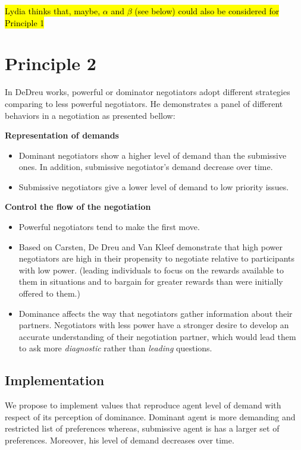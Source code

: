 \documentclass{article}
\begin{document}
\hl{Lydia thinks that, maybe, $\alpha$ and $\beta$ (see below) could also be considered for Principle 1}


\section{Principle 2}

In DeDreu works, powerful or dominator negotiators adopt different strategies comparing to less powerful negotiators. He demonstrates a panel of different behaviors in a negotiation as presented bellow:


\textbf{Representation of demands}
\begin{itemize}
	\item Dominant negotiators show a higher level of demand than the submissive ones. In addition, submissive negotiator's demand decrease over time. 
	\item Submissive negotiators give a lower level of demand to low priority issues.
\end{itemize} 



\textbf{Control the flow of the negotiation}
\begin{itemize}
	\item Powerful negotiators tend to make the first move. \cite{magee2007power}

	\item Based on Carsten, De Dreu and Van Kleef demonstrate that high power negotiators are high in their propensity to negotiate relative to participants with low power. (leading individuals to focus on the rewards available to them in situations and to bargain for	greater rewards than were initially offered to them.)

	\item Dominance affects the way that negotiators gather information about their partners. Negotiators with less power have a stronger desire to develop an accurate understanding of their negotiation partner, which would lead them to ask more \emph{diagnostic} rather than \emph{leading} questions.
	
\end{itemize} 

\subsection{Implementation}
We propose to implement values that reproduce agent level of demand with respect of its perception of dominance. Dominant agent is more demanding and restricted list of preferences whereas, submissive agent is has a larger set of preferences. Moreover, his level of demand decreases over time.
\end{document}
